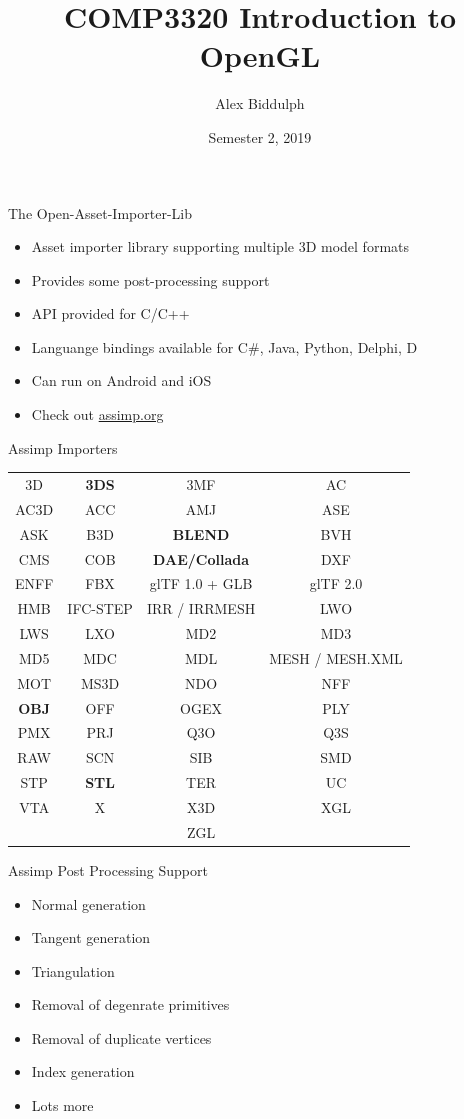 \documentclass{beamer}
\title{COMP3320 Introduction to OpenGL}
\author{Alex Biddulph}
\institute{
    The University of Newcastle, Australia
    \and
    Based on the work provided at \url{www.learnopengl.com}
}
\date{Semester 2, 2019}
\begin{document}
\begin{frame}
\titlepage
\end{frame}

\begin{frame}[fragile]{The Open-Asset-Importer-Lib}
    \begin{itemize}
        \item Asset importer library supporting multiple 3D model formats
        \item Provides some post-processing support
        \item API provided for C/C++
        \item Languange bindings available for C\#, Java, Python, Delphi, D
        \item Can run on Android and iOS
        \item Check out \url{assimp.org}
    \end{itemize}
\end{frame}

\begin{frame}[fragile]{Assimp Importers}
    \begin{tabular}{cccc}
        3D & \textbf{3DS} & 3MF & AC \\
        AC3D & ACC & AMJ & ASE \\
        ASK & B3D & \textbf{BLEND} & BVH \\
        CMS & COB & \textbf{DAE/Collada} & DXF \\
        ENFF & FBX & glTF 1.0 + GLB & glTF 2.0 \\
        HMB & IFC-STEP & IRR / IRRMESH & LWO \\
        LWS & LXO & MD2 & MD3 \\
        MD5 & MDC & MDL & MESH / MESH.XML \\
        MOT & MS3D & NDO & NFF \\
        \textbf{OBJ} & OFF & OGEX & PLY \\
        PMX & PRJ & Q3O & Q3S \\
        RAW & SCN & SIB & SMD \\
        STP & \textbf{STL} & TER & UC \\
        VTA & X & X3D & XGL \\
            &   & ZGL &
    \end{tabular}
\end{frame}

\begin{frame}[fragile]{Assimp Post Processing Support}
    \begin{itemize}
        \item Normal generation
        \item Tangent generation
        \item Triangulation
        \item Removal of degenrate primitives
        \item Removal of duplicate vertices
        \item Index generation
        \item Lots more
    \end{itemize}
\end{frame}
\end{document}
